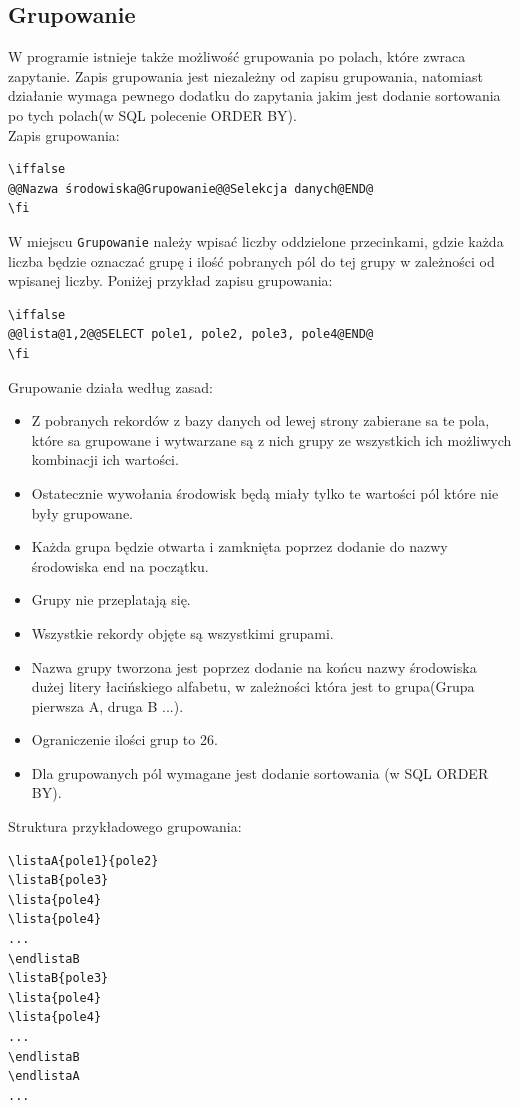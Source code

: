 \subsection{Grupowanie}
W programie istnieje także możliwość grupowania po polach, które zwraca zapytanie. Zapis grupowania jest niezależny od zapisu grupowania, natomiast działanie wymaga pewnego dodatku do zapytania jakim jest dodanie sortowania po tych polach(w SQL polecenie ORDER BY).\\
Zapis grupowania:
\begin{lstlisting}
\iffalse 
@@Nazwa środowiska@Grupowanie@@Selekcja danych@END@
\fi
\end{lstlisting}
W miejscu \texttt{Grupowanie} należy wpisać liczby oddzielone przecinkami, gdzie każda liczba będzie oznaczać grupę i ilość pobranych pól do tej grupy w zależności od wpisanej liczby. Poniżej przykład zapisu grupowania:
\begin{lstlisting}
\iffalse 
@@lista@1,2@@SELECT pole1, pole2, pole3, pole4@END@
\fi
\end{lstlisting}
\par 
Grupowanie działa według zasad:
\begin{itemize}
\item Z pobranych rekordów z bazy danych od lewej strony zabierane sa te pola, które sa grupowane i wytwarzane są z nich grupy ze wszystkich ich możliwych kombinacji ich wartości. 
\item Ostatecznie wywołania środowisk będą miały tylko te wartości pól które nie były grupowane.
\item Każda grupa będzie otwarta i zamknięta poprzez dodanie do nazwy środowiska end na początku.
\item Grupy nie przeplatają się.
\item Wszystkie rekordy objęte są wszystkimi grupami.
\item Nazwa grupy tworzona jest poprzez dodanie na końcu nazwy środowiska dużej litery łacińskiego alfabetu, w zależności która jest to grupa(Grupa pierwsza A, druga B ...). 
\item Ograniczenie ilości grup to 26.
\item Dla grupowanych pól wymagane jest dodanie sortowania (w SQL ORDER BY).
\end{itemize}

Struktura przykładowego grupowania:
\begin{lstlisting}
\listaA{pole1}{pole2}
\listaB{pole3}
\lista{pole4}
\lista{pole4}
...
\endlistaB
\listaB{pole3}
\lista{pole4}
\lista{pole4}
...
\endlistaB
\endlistaA
...
\end{lstlisting}


